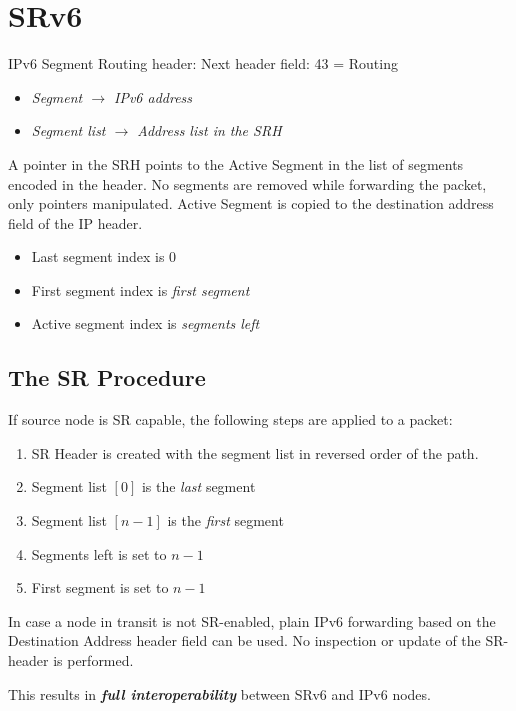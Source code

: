 \section{SRv6}

IPv6 Segment Routing header: 
Next header field: 43 = Routing

\begin{itemize}
    \item \emph{Segment $\rightarrow$ IPv6 address}
    \item \emph{Segment list $\rightarrow$ Address list in the SRH}
\end{itemize}

A pointer in the SRH points to the Active Segment in the list of segments encoded in the header. No segments are removed while forwarding the packet, only pointers manipulated.
Active Segment is copied to the destination address field of the IP header.

\begin{itemize}
    \item Last segment index is 0
    \item First segment index is \emph{first segment}
    \item Active segment index is \emph{segments left}
\end{itemize}

\subsection{The SR Procedure}
If source node is SR capable, the following steps are applied to a packet:
\begin{enumerate}
    \item SR Header is created with the segment list in reversed order of the path.
    \item Segment list $[0]$ is the \emph{last} segment
    \item Segment list $[n-1]$ is the \emph{first} segment
    \item Segments left is set to $n-1$
    \item First segment is set to $n-1$
\end{enumerate}

In case a node in transit is not SR-enabled, plain IPv6 forwarding based on the Destination Address header field can be used. 
No inspection or update of the SR-header is performed.

This results in \emph{\textbf{full interoperability}} between SRv6 and IPv6 nodes.

